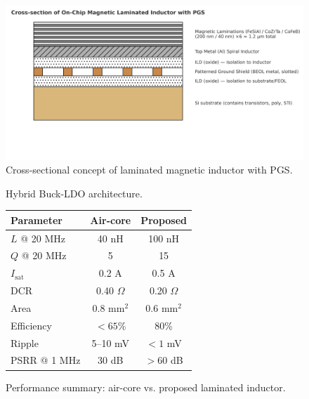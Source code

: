 \documentclass[conference]{IEEEtran}
\begin{document}
\begin{figure}[!t]
\centering
\includegraphics[width=0.9\linewidth]{fig/fig1_laminated_cross_section.png}
\caption{Cross-sectional concept of laminated magnetic inductor with PGS.}
\label{fig1}
\end{figure}

\begin{figure}[!t]
\centering
{}
\caption{Hybrid Buck-LDO architecture.}
\label{fig2}
\end{figure}

\begin{figure}[!t]
\centering
\begin{tabular}{lcc}
\toprule
Parameter & Air-core & Proposed \\
\midrule
$L$ @ 20 MHz & 40 nH & 100 nH \\
$Q$ @ 20 MHz & 5 & 15 \\
$I_{\mathrm{sat}}$ & 0.2 A & 0.5 A \\
DCR & 0.40 $\Omega$ & 0.20 $\Omega$ \\
Area & 0.8 mm$^2$ & 0.6 mm$^2$ \\
Efficiency & $<65$\% & 80\% \\
Ripple & 5--10 mV & $<1$ mV \\
PSRR @ 1 MHz & 30 dB & $>60$ dB \\
\bottomrule
\end{tabular}
\caption{Performance summary: air-core vs. proposed laminated inductor.}
\label{fig3}
\end{figure}
\end{document}
